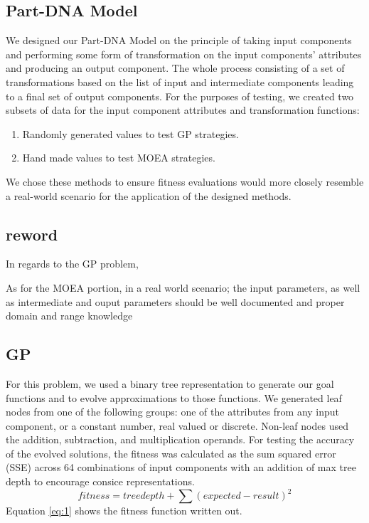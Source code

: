 \documentclass{IEEEtran}
\begin{document}
\subsection{Part-DNA Model}
We designed our Part-DNA Model on the principle of taking input components and performing some form of transformation on the input components' attributes and producing an output component. The whole process consisting of a set of transformations based on the list of input and intermediate components leading to a final set of output components. For the purposes of testing, we created two subsets of data for the input component attributes and transformation functions:
\begin{enumerate}
\item Randomly generated values to test GP strategies.
\item Hand made values to test MOEA strategies.
\end{enumerate}
We chose these methods to ensure fitness evaluations would more closely resemble a real-world scenario for the application of the designed methods.

\subsection{reword}
In regards to the GP problem,

As for the MOEA portion, in a real world scenario; the input parameters, as well as intermediate and ouput parameters should be well documented and proper domain and range knowledge

\subsection{GP}
For this problem, we used a binary tree representation to generate our goal functions and to evolve approximations to those functions. We generated leaf nodes from one of the following groups: one of the attributes from any input component, or a constant number, real valued or discrete. Non-leaf nodes used the addition, subtraction, and multiplication operands. For testing the accuracy of the evolved solutions, the fitness was calculated as the sum squared error (SSE) across 64 combinations of input components with an addition of max tree depth to encourage consice representations.
\begin{equation} \label{eq:1}
fitness=treedepth + \sum (expected-result)^{2}
\end{equation}
Equation \ref{eq:1} shows the fitness function written out.
\end{document}
